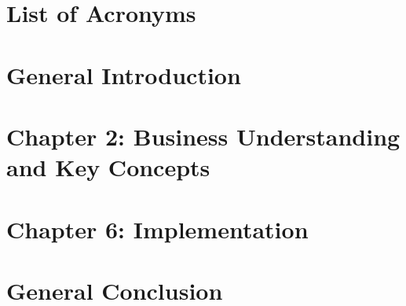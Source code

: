 \documentclass{report}
\begin{document}
\chapter*{List of Acronyms}


\newpage

\chapter*{General Introduction}


\newpage

\setcounter{chapter}{2}  %
\setcounter{section}{0}
\chapter*{Chapter 2: Business Understanding and Key Concepts}



\newpage

\setcounter{chapter}{6}  %
\setcounter{section}{0}
\chapter*{Chapter 6: Implementation}








\newpage

\chapter*{General Conclusion}

\end{document}
